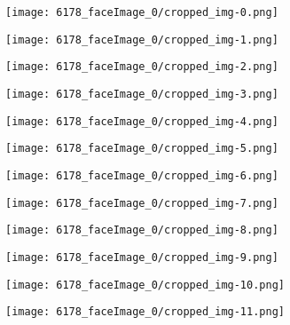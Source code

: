\begin{figure}
\centering
\parbox{\textwidth}{
\begin{subfigure}{0.09\textwidth}
  \centering
  \texttt{[image: 6178\_faceImage\_0/cropped\_img-0.png]}
\end{subfigure}
\begin{subfigure}{0.09\textwidth}
  \centering
  \texttt{[image: 6178\_faceImage\_0/cropped\_img-1.png]}
\end{subfigure}
\begin{subfigure}{0.09\textwidth}
  \centering
  \texttt{[image: 6178\_faceImage\_0/cropped\_img-2.png]}
\end{subfigure}
\begin{subfigure}{0.09\textwidth}
  \centering
  \texttt{[image: 6178\_faceImage\_0/cropped\_img-3.png]}
\end{subfigure}
\begin{subfigure}{0.09\textwidth}
  \centering
  \texttt{[image: 6178\_faceImage\_0/cropped\_img-4.png]}
\end{subfigure}
\begin{subfigure}{0.09\textwidth}
  \centering
  \texttt{[image: 6178\_faceImage\_0/cropped\_img-5.png]}
\end{subfigure}
\begin{subfigure}{0.09\textwidth}
  \centering
  \texttt{[image: 6178\_faceImage\_0/cropped\_img-6.png]}
\end{subfigure}
\begin{subfigure}{0.09\textwidth}
  \centering
  \texttt{[image: 6178\_faceImage\_0/cropped\_img-7.png]}
\end{subfigure}
\begin{subfigure}{0.09\textwidth}
  \centering
  \texttt{[image: 6178\_faceImage\_0/cropped\_img-8.png]}
\end{subfigure}
\begin{subfigure}{0.09\textwidth}
  \centering
  \texttt{[image: 6178\_faceImage\_0/cropped\_img-9.png]}
\end{subfigure}
}
\parbox{\textwidth}{
\begin{subfigure}{0.09\textwidth}
  \centering
  \texttt{[image: 6178\_faceImage\_0/cropped\_img-10.png]}
\end{subfigure}
\begin{subfigure}{0.09\textwidth}
  \centering
  \texttt{[image: 6178\_faceImage\_0/cropped\_img-11.png]}

\end{subfigure}}
\end{figure}
